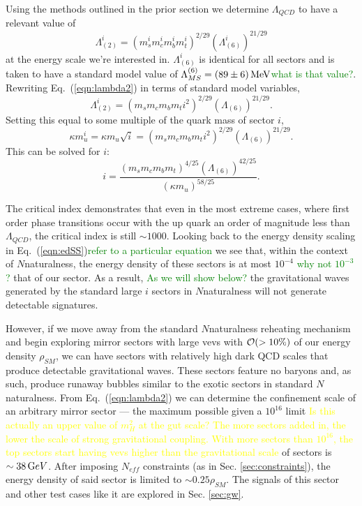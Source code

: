 \documentclass[nofootinbib,twocolumn,preprintnumbers]{revtex4-1}
\begin{document}
Using the methods outlined in the prior section we determine $\Lambda_{QCD}$ to have a relevant value of 
\begin{equation}\label{eqn:lambda2}
\Lambda^i_{(2)} = (m_s^i m_c^i m_b^i m_t^i)^{2/29}(\Lambda^i_{(6)})^{21/29}
\end{equation} 
at the energy scale we're interested in. $\Lambda^i_{(6)}$ is identical for all sectors and is taken to have a standard model value of $\Lambda^{(6)}_{MS} =(89 \pm 6)\, {\rm MeV}$\cite{PhysRevD.98.030001}\textcolor{green}{what is that value?}. Rewriting Eq.~(\ref{eqn:lambda2}) in terms of standard model variables, 
\begin{equation}\label{eqn:lambda2adj}
\Lambda^i_{(2)} = (m_s m_c m_b m_t i^2)^{2/29}(\Lambda_{(6)})^{21/29}.
\end{equation}
Setting this equal to some multiple of the quark mass of sector $i$,
\begin{equation}
\kappa m^i_u = \kappa m_u \sqrt{i} = (m_s m_c m_b m_t i^2)^{2/29}(\Lambda_{(6)})^{21/29}.
\end{equation}
This can be solved for $i$:
\begin{equation}\label{eqn:critIndex}
i = \frac{(m_s m_c m_b m_t)^{4/25}(\Lambda_{(6)})^{42/25}}{(\kappa m_u)^{58/25}}.
\end{equation}
 
The critical index demonstrates that even in the most extreme cases, where first order phase transitions occur with the up quark an order of magnitude less than $\Lambda_{QCD}$, the critical index is still $\sim 1000$. Looking back to the energy density scaling in Eq.~(\ref{eqn:edSS})\textcolor{green}{refer to a particular equation} we see that, within the context of $N$naturalness, the energy density of these sectors is at most $10^{-4}$ \textcolor{green}{why not $10^{-3}$?} that of our sector. As a result, \textcolor{green}{As we will show below?} the gravitational waves generated by the standard large $i$ sectors in $N$naturalness will not generate detectable signatures. 

However, if we move away from the standard $N$naturalness reheating mechanism and begin exploring mirror sectors with large vevs with ${\cal O}( >10\%)$ of our energy density $\rho_{SM}$, we can have sectors with relatively high dark QCD scales that produce detectable gravitational waves. These sectors feature no baryons and, as such, produce runaway bubbles similar to the exotic sectors in standard $N$naturalness. From Eq.~(\ref{eqn:lambda2}) we can determine the confinement scale of an arbitrary mirror sector --- the maximum possible given a $10^{16}$ limit \cite{Arkani-Hamed:2016rle} \textcolor{yellow}{Is this actually an upper value of $m_H^2$ at the gut scale? The more sectors added in, the lower the scale of strong gravitational coupling. With more sectors than $10^16$, the top sectors start having vevs higher than the gravitational scale} of sectors is $\sim 38 \,{\mathrm GeV}$. After imposing $N_{eff}$ constraints (as in Sec. \ref{sec:constraints}), the energy density of said sector is limited to $\sim 0.25\rho_{SM}$. The signals of this sector and other test cases like it are explored in Sec. \ref{sec:gw}. 
\end{document}
